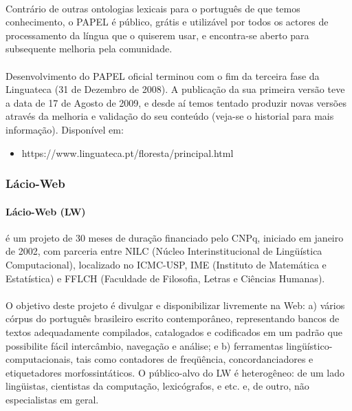 \documentclass[a4paper, 10pt]{article}
\begin{document}
				\paragraph{} Contrário de outras ontologias lexicais para o português de que temos conhecimento, o PAPEL é público, grátis e utilizável por todos os actores de processamento da língua que o quiserem usar, e encontra-se aberto para subsequente melhoria pela comunidade.
				\paragraph{} Desenvolvimento do PAPEL oficial terminou com o fim da terceira fase da Linguateca (31 de Dezembro de 2008). A publicação da sua primeira versão teve a data de 17 de Agosto de 2009, e desde aí temos tentado produzir novas versões através da melhoria e validação do seu conteúdo (veja-se o historial para mais informação).
				Disponível em:
            	\begin{itemize}
				\item https://www.linguateca.pt/floresta/principal.html

			    \end{itemize}

            \subsubsection{Lácio-Web}
            	\paragraph{Lácio-Web (LW)} é um projeto de 30 meses de duração financiado pelo CNPq, iniciado em janeiro de 2002, com parceria entre NILC (Núcleo Interinstitucional de Lingüística Computacional), localizado no ICMC-USP, IME (Instituto de Matemática e Estatística) e FFLCH (Faculdade de Filosofia, Letras e Ciências Humanas).
                \paragraph{}O objetivo deste projeto é divulgar e disponibilizar livremente na Web: a) vários córpus do português brasileiro escrito contemporâneo, representando bancos de textos adequadamente compilados, catalogados e codificados em um padrão que possibilite fácil intercâmbio, navegação e análise; e b) ferramentas lingüístico-computacionais, tais como contadores de freqüência, concordanciadores e etiquetadores morfossintáticos. O público-alvo do LW é heterogêneo: de um lado lingüistas, cientistas da computação, lexicógrafos, e etc. e, de outro, não especialistas em geral.
\end{document}
